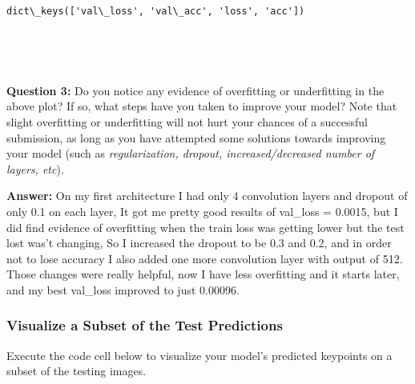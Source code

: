 \documentclass[11pt]{article}
\begin{document}
    \begin{Verbatim}[commandchars=\\\{\}]
dict\_keys(['val\_loss', 'val\_acc', 'loss', 'acc'])

    \end{Verbatim}

    \begin{center}
    \end{center}
    { \hspace*{\fill} \\}
    
    \begin{center}
    \end{center}
    { \hspace*{\fill} \\}
    
    \textbf{Question 3:} Do you notice any evidence of overfitting or
underfitting in the above plot? If so, what steps have you taken to
improve your model? Note that slight overfitting or underfitting will
not hurt your chances of a successful submission, as long as you have
attempted some solutions towards improving your model (such as
\emph{regularization, dropout, increased/decreased number of layers,
etc}).

\textbf{Answer:} On my first architecture I had only 4 convolution
layers and dropout of only 0.1 on each layer, It got me pretty good
results of val\_loss = 0.0015, but I did find evidence of overfitting
when the train loss was getting lower but the test lost was't changing,
So I increased the dropout to be 0.3 and 0.2, and in order not to lose
accuracy I also added one more convolution layer with output of 512.
Those changes were really helpful, now I have less overfitting and it
starts later, and my best val\_loss improved to just 0.00096.

    \subsubsection{Visualize a Subset of the Test
Predictions}\label{visualize-a-subset-of-the-test-predictions}

Execute the code cell below to visualize your model's predicted
keypoints on a subset of the testing images.
\end{document}
